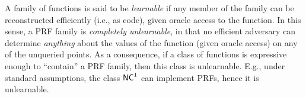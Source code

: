\documentclass[11pt]{article}
\begin{document}
A family of functions is said to be \emph{learnable} if any member of
the family can be reconstructed efficiently (i.e., as code), given
oracle access to the function.  In this sense, a PRF family is
\emph{completely unlearnable}, in that no efficient adversary can
determine \emph{anything} about the values of the function (given
oracle access) on any of the unqueried points.  As a consequence, if a
class of functions is expressive enough to ``contain'' a PRF family,
then this class is unlearnable.  E.g., under standard assumptions, the
class $\mathsf{NC}^{1}$ can implement PRFs, hence it is unlearnable.
\end{document}

